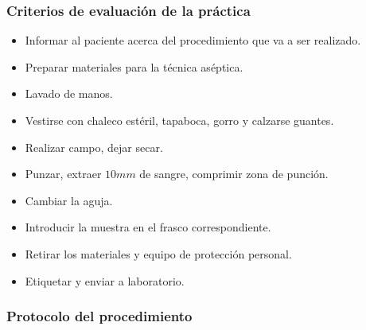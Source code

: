 \subsubsection{Criterios de evaluación de la práctica}
\begin{itemize}
\item Informar al paciente acerca del procedimiento que va a ser realizado.
\item Preparar materiales para la técnica aséptica.
\item Lavado de manos.
\item Vestirse con chaleco estéril, tapaboca, gorro y calzarse guantes.
\item Realizar campo, dejar secar.
\item Punzar, extraer $10mm$ de sangre, comprimir zona de punción.
\item Cambiar la aguja.
\item Introducir la muestra en el frasco correspondiente.
\item Retirar los materiales y equipo de protección personal.
\item Etiquetar y enviar a laboratorio.
\end{itemize}

\subsubsection{Protocolo del procedimiento}

